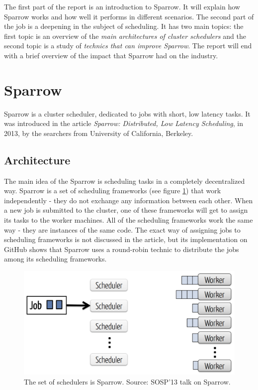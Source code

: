 \documentclass[11pt]{article}
\begin{document}
    The first part of the report is an introduction to Sparrow. It will explain how Sparrow works and how well it performs in different scenarios. The second part of the job is a deepening in the subject of scheduling. It has two main topics: the first topic is an overview of the \textit{main architectures of cluster schedulers} and the second topic is a study of \textit{technics that can improve Sparrow}. The report will end with a brief overview of the impact that Sparrow had on the industry.

\section{Sparrow}

	Sparrow is a cluster scheduler, dedicated to jobs with short, low latency tasks. It was introduced in the article \textit{Sparrow: Distributed, Low Latency Scheduling}, in 2013, by the searchers from University of California, Berkeley.


	\subsection{Architecture}
    	\label{sparrowarchie}

		The main idea of the Sparrow is scheduling tasks in a completely decentralized way. Sparrow is a set of scheduling frameworks (see figure \ref{fig1}) that work independently - they do not exchange any information between each other. When a new job is submitted to the cluster, one of these frameworks will get to assign its tasks to the worker machines. All of the scheduling frameworks work the same way - they are instances of the same code. The exact way of assigning jobs to scheduling frameworks is not discussed in the article, but its implementation on GitHub shows that Sparrow uses a round-robin technic to distribute the jobs among its scheduling frameworks.
		
	\begin{figure}
		\includegraphics[scale=.25]{sparrow}
		\caption{The set of schedulers is Sparrow. Source: SOSP'13 talk on Sparrow.}
		\label{fig1}
	\end{figure}
\end{document}

